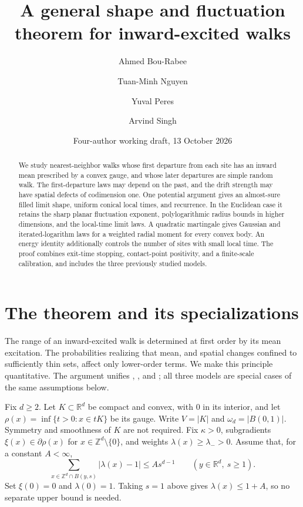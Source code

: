 \documentclass[11pt]{amsart}
\title[Inward-excited walks]{A general shape and fluctuation theorem for inward-excited walks}
\author{Ahmed Bou-Rabee}
\author{Tuan-Minh Nguyen}
\author{Yuval Peres}
\author{Arvind Singh}
\date{Four-author working draft, 13 October 2026}
\theoremstyle{plain}
\theoremstyle{definition}
\numberwithin{equation}{section}
\newcommand{\R}{\mathbb R}
\newcommand{\Z}{\mathbb Z}
\begin{document}
\begin{abstract}
We study nearest-neighbor walks whose first departure from each site has
an inward mean prescribed by a convex gauge, and whose later departures
are simple random walk. The first-departure laws may depend on the past,
and the drift strength may have spatial defects of codimension one.
One potential argument gives an almost-sure filled limit shape, uniform
conical local times, and recurrence. In the Euclidean case it retains
the sharp planar fluctuation exponent, polylogarithmic radius bounds
in higher dimensions, and the local-time limit laws. A quadratic
martingale gives Gaussian and iterated-logarithm laws for a weighted
radial moment for every convex body. An energy identity additionally
controls the number of sites with small local time. The proof combines
exit-time stopping, contact-point positivity, and a finite-scale
calibration, and includes the three previously studied models.
\end{abstract}
\maketitle

\section{The theorem and its specializations}

The range of an inward-excited walk is determined at first order by its
mean excitation. The probabilities realizing that mean, and spatial
changes confined to sufficiently thin sets, affect only lower-order
terms. We make this principle quantitative. The argument unifies
\citet{Singh2026}, \citet{BouRabeePeres2026CERW}, and
\citet{Nguyen2026}; all three models are special cases of the same
assumptions below.

Fix $d\ge2$. Let $K\subset\R^d$ be compact and convex, with $0$ in its
interior, and let $\rho(x)=\inf\{t>0:x\in tK\}$ be its gauge.
Write $V=|K|$ and $\omega_d=|B(0,1)|$. Symmetry and smoothness of $K$
are not required. Fix $\kappa>0$, subgradients
$\xi(x)\in\partial\rho(x)$ for $x\in\Z^d\setminus\{0\}$, and weights
$\lambda(x)\ge\lambda_->0$. Assume that, for a
constant $A<\infty$,
\begin{equation}\label{eq:model-defect}
 \sum_{x\in\Z^d\cap B(y,s)}|\lambda(x)-1|
 \le A s^{d-1}\qquad(y\in\R^d,\ s\ge1).
\end{equation}
Set $\xi(0)=0$ and $\lambda(0)=1$. Taking $s=1$ above gives
$\lambda(x)\le1+A$, so no separate upper bound is needed.
\end{document}

